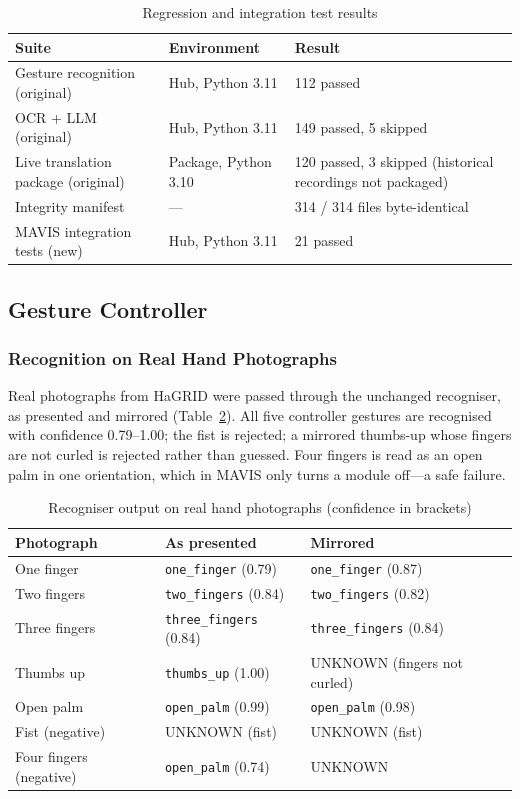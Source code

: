\documentclass[12pt,singleside,a4paper]{article}
\begin{document}
\begin{table}[H]
\centering
\caption{Regression and integration test results}
\label{tab:regress}
\small
\begin{tabularx}{\textwidth}{@{}p{4.8cm}p{3.6cm}X@{}}
\toprule
\textbf{Suite} & \textbf{Environment} & \textbf{Result} \\
\midrule
Gesture recognition (original) & Hub, Python 3.11 & 112 passed \\
OCR + LLM (original) & Hub, Python 3.11 & 149 passed, 5 skipped \\
Live translation package (original) & Package, Python 3.10 & 120 passed, 3 skipped (historical recordings not packaged) \\
Integrity manifest & --- & 314 / 314 files byte-identical \\
MAVIS integration tests (new) & Hub, Python 3.11 & 21 passed \\
\bottomrule
\end{tabularx}
\end{table}

\subsection{Gesture Controller}
\subsubsection{Recognition on Real Hand Photographs}
Real photographs from HaGRID \cite{kapitanov2024} were passed through the unchanged recogniser, as presented and mirrored (Table~\ref{tab:realhands}). All five controller gestures are recognised with confidence 0.79--1.00; the fist is rejected; a mirrored thumbs-up whose fingers are not curled is rejected rather than guessed. Four fingers is read as an open palm in one orientation, which in MAVIS only turns a module off---a safe failure.

\begin{table}[H]
\centering
\caption{Recogniser output on real hand photographs (confidence in brackets)}
\label{tab:realhands}
\small
\begin{tabular}{@{}lll@{}}
\toprule
\textbf{Photograph} & \textbf{As presented} & \textbf{Mirrored} \\
\midrule
One finger & \texttt{one\_finger} (0.79) & \texttt{one\_finger} (0.87) \\
Two fingers & \texttt{two\_fingers} (0.84) & \texttt{two\_fingers} (0.82) \\
Three fingers & \texttt{three\_fingers} (0.84) & \texttt{three\_fingers} (0.84) \\
Thumbs up & \texttt{thumbs\_up} (1.00) & UNKNOWN (fingers not curled) \\
Open palm & \texttt{open\_palm} (0.99) & \texttt{open\_palm} (0.98) \\
Fist (negative) & UNKNOWN (fist) & UNKNOWN (fist) \\
Four fingers (negative) & \texttt{open\_palm} (0.74) & UNKNOWN \\
\bottomrule
\end{tabular}
\end{table}
\end{document}
